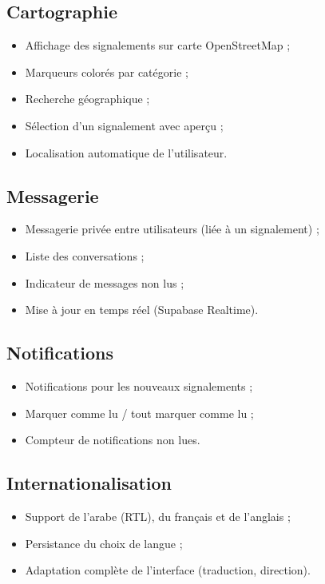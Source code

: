 \documentclass[12pt,a4paper]{report}
\begin{document}
\subsection{Cartographie}
\begin{itemize}
    \item Affichage des signalements sur carte OpenStreetMap ;
    \item Marqueurs colorés par catégorie ;
    \item Recherche géographique ;
    \item Sélection d'un signalement avec aperçu ;
    \item Localisation automatique de l'utilisateur.
\end{itemize}

\subsection{Messagerie}
\begin{itemize}
    \item Messagerie privée entre utilisateurs (liée à un signalement) ;
    \item Liste des conversations ;
    \item Indicateur de messages non lus ;
    \item Mise à jour en temps réel (Supabase Realtime).
\end{itemize}

\subsection{Notifications}
\begin{itemize}
    \item Notifications pour les nouveaux signalements ;
    \item Marquer comme lu / tout marquer comme lu ;
    \item Compteur de notifications non lues.
\end{itemize}

\subsection{Internationalisation}
\begin{itemize}
    \item Support de l'arabe (RTL), du français et de l'anglais ;
    \item Persistance du choix de langue ;
    \item Adaptation complète de l'interface (traduction, direction).
\end{itemize}
\end{document}
